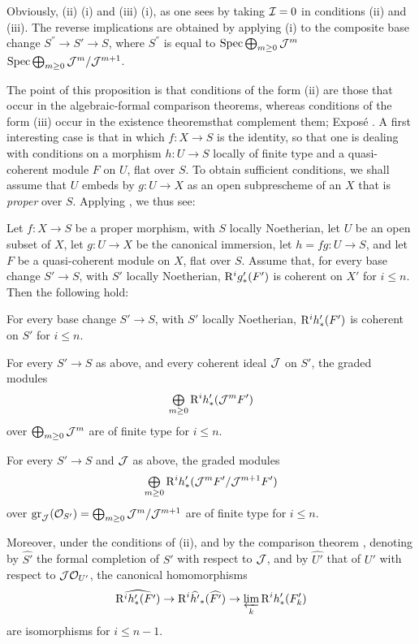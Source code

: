 Obviously, (ii) \ALORS (i) and (iii) \ALORS (i), as one sees by taking $\mathcal I=0$ in conditions (ii) and (iii). The reverse implications are obtained by applying (i) to the composite base change $S^{''}\to S'\to S$, where $S^{''}$ is equal to $\operatorname{Spec} \bigoplus_{m\geq 0} \mathcal J^m$ \resp $\operatorname{Spec} \bigoplus_{m\geq 0} \mathcal J^m/\mathcal J^{m+1}$.

The point of this proposition is that conditions of the form (ii) are those that occur in the \og algebraic-formal comparison theorems\fg, whereas conditions of the form (iii) occur in the \og existence theorems\fg that complement them; \cf Expos\'e . A first interesting case is that in which $f:X\to S$ is the identity, so that one is dealing with conditions on a morphism $h:U\to S$ locally of finite type and a quasi-coherent module $F$ on $U$, flat over $S$. To obtain sufficient conditions, we shall assume that $U$ embeds by $g:U\to X$ as an open subprescheme of an $X$ that is \emph{proper} over $S$. Applying , we thus see:

\begin{corollaire} \label{XII.5.8}
Let $f:X\to S$ be a proper morphism, with $S$ locally Noetherian, let $U$ be an open subset of $X$, let $g:U\to X$ be the canonical immersion, let $h=fg:U\to S$, and let $F$ be a quasi-coherent module on $X$, flat over $S$. Assume that, for every base change $S'\to S$, with $S'$ locally Noetherian, $\mathrm R^ig'_\ast(F')$ is coherent on $X'$ for $i\leq n$. Then the following hold:
\begin{enumeratei}
\item
For every base change $S'\to S$, with $S'$ locally Noetherian, $\mathrm R^ih'_\ast(F')$ is coherent on $S'$ for $i\leq n$.
\item
For every $S'\to S$ as above, and every coherent ideal $\mathcal J$ on $S'$, the graded modules\pageoriginale
\[
\mathop{\textstyle\bigoplus}\limits_{m\geq 0} \mathrm R^ih'_\ast(\mathcal J^mF')
\]
over $\bigoplus_{m\geq 0}\mathcal J^m$ are of finite type for $i\leq n$.
\item
For every $S'\to S$ and $\mathcal J$ as above, the graded modules
\[
\mathop{\textstyle\bigoplus}\limits_{m\geq 0} \mathrm R^ih'_\ast(\mathcal J^mF'/\mathcal J^{m+1}F')
\]
over $\operatorname{gr}_\mathcal J(\mathcal O_{S'})=\bigoplus_{m\geq 0}\mathcal J^m/\mathcal J^{m+1}$ are of finite type for $i\leq n$.

Moreover, under the conditions of (ii), and by the comparison theorem , denoting by $\widehat{S'}$ the formal completion of $S'$ with respect to $\mathcal J$, and by $\widehat{U'}$ that of $U'$ with respect to $\mathcal J\mathcal O_{U'}$, the canonical homomorphisms
\[
\widehat{\mathrm R^ih'_\ast(F')} \to \mathrm R^i\widehat{h'}_\ast(\widehat{F'}) \to \varprojlim_k\mathrm R^ih'_\ast(F'_k)
\]
are isomorphisms for $i\leq n-1$.
\end{enumeratei}
\end{corollaire}

